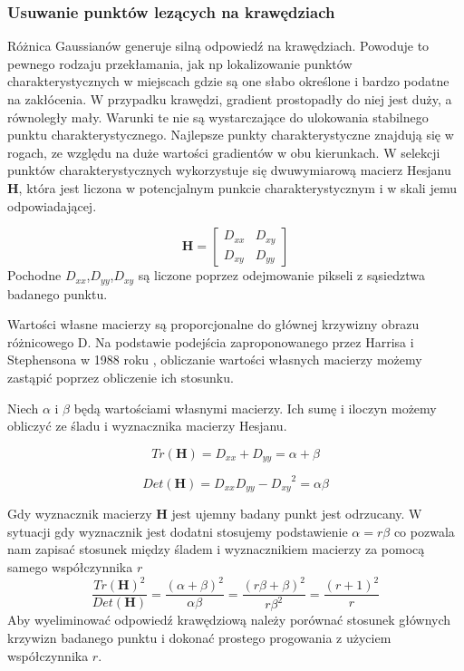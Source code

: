 \subsubsection{Usuwanie punktów lezących na krawędziach}
Różnica Gaussianów generuje silną odpowiedź na krawędziach. Powoduje to pewnego rodzaju przekłamania, jak np lokalizowanie punktów charakterystycznych w miejscach gdzie są one słabo określone i bardzo podatne na zakłócenia. 
W przypadku krawędzi, gradient prostopadły do niej jest duży, a równoległy mały. Warunki te nie są wystarczające do ulokowania stabilnego punktu charakterystycznego. Najlepsze punkty charakterystyczne znajdują się w rogach, ze względu na duże wartości gradientów w obu kierunkach.
W selekcji punktów charakterystycznych wykorzystuje się dwuwymiarową macierz Hesjanu \textbf{H}, która jest liczona w potencjalnym punkcie charakterystycznym i w skali jemu odpowiadającej.

\begin{equation}
\textbf{H} = 
\left[\begin{array}{cc}
D_{xx}&D_{xy}\\
D_{xy}&D_{yy}
\end{array}\right]
\end{equation}
Pochodne $D_{xx}$,$D_{yy}$,$D_{xy}$ są liczone poprzez odejmowanie pikseli z sąsiedztwa badanego punktu.


Wartości własne macierzy są proporcjonalne do głównej krzywizny obrazu różnicowego D. Na podstawie podejścia zaproponowanego przez Harrisa i Stephensona w 1988 roku \cite{HIS88}, obliczanie wartości własnych macierzy możemy zastąpić poprzez obliczenie ich stosunku. 

Niech $\alpha$ i $\beta$ będą wartościami własnymi macierzy. Ich sumę i iloczyn możemy obliczyć ze śladu i wyznacznika macierzy Hesjanu. 

\begin{equation}
Tr(\textbf{H}) = D_{xx} + D_{yy} = \alpha + \beta
\end{equation}

\begin{equation}
Det(\textbf{H}) = D_{xx} D_{yy} - {D_{xy}}^2 = \alpha  \beta
\end{equation}

Gdy wyznacznik macierzy \textbf{H} jest ujemny badany punkt jest odrzucany. W sytuacji gdy wyznacznik jest dodatni stosujemy podstawienie $\alpha = r \beta$ co pozwala nam zapisać stosunek między śladem i wyznacznikiem macierzy za pomocą samego współczynnika $r$
\begin{equation}
\frac{Tr(\textbf{H})^2}{Det(\textbf{H})} = \frac{(\alpha+\beta)^2}{\alpha\beta} = \frac{(r\beta+\beta)^2}{r\beta^2} = \frac{(r+1)^2}{r} 
\end{equation}
Aby wyeliminować odpowiedź krawędziową należy porównać stosunek głównych krzywizn badanego punktu i dokonać prostego progowania z użyciem współczynnika $r$.
 

